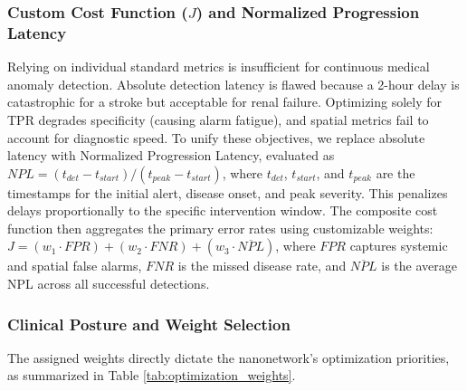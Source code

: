 \documentclass[sigconf]{acmart}
\begin{document}
\subsubsection{Custom Cost Function ($J$) and Normalized Progression Latency}
Relying on individual standard metrics is insufficient for continuous medical anomaly detection. Absolute detection latency is flawed because a 2-hour delay is catastrophic for a stroke but acceptable for renal failure. Optimizing solely for TPR degrades specificity (causing alarm fatigue), and spatial metrics fail to account for diagnostic speed. To unify these objectives, we replace absolute latency with Normalized Progression Latency, evaluated as $NPL = (t_{det} - t_{start}) / (t_{peak} - t_{start})$, where $t_{det}$, $t_{start}$, and $t_{peak}$ are the timestamps for the initial alert, disease onset, and peak severity. This penalizes delays proportionally to the specific intervention window. The composite cost function then aggregates the primary error rates using customizable weights: $J = (w_1 \cdot FPR) + (w_2 \cdot FNR) + (w_3 \cdot \overline{NPL})$, where $FPR$ captures systemic and spatial false alarms, $FNR$ is the missed disease rate, and $\overline{NPL}$ is the average NPL across all successful detections.

\subsubsection{Clinical Posture and Weight Selection} 
The assigned weights directly dictate the nanonetwork's optimization priorities, as summarized in Table \ref{tab:optimization_weights}.

\begin{table}[htbp]
    \centering
    \scriptsize
    \renewcommand{\arraystretch}{1.1}
    \setlength{\tabcolsep}{4pt}
    \caption{Cost Function Weights and Optimization Postures.}
    \label{tab:optimization_weights}
\end{table}
\end{document}
